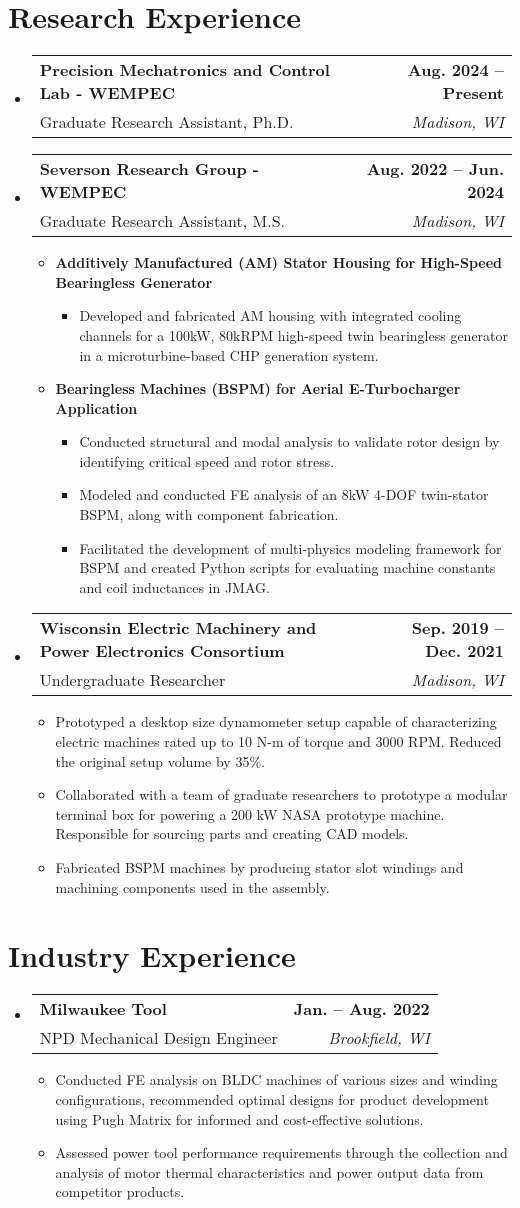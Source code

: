 \documentclass[letterpaper,11pt]{article}
\makeatletter
\newcommand{\resumeItem}[1]{
  \item\small{
    {#1 \vspace{-2pt}}
  }
}
\newcommand{\resumeSubItem}[1]{
  \item[$\circ$]\small{
    {#1 \vspace{-2pt}}
  }
}
\newcommand{\resumeSubheading}[4]{
  \vspace{-2pt}\item
    \begin{tabular*}{1.0\textwidth}[t]{l@{\extracolsep{\fill}}r}
      \textbf{#1} & \textbf{\small #2} \\
      \small#3 & \textit{\small #4} \\
    \end{tabular*}\vspace{-7pt}
}
\newcommand{\resumeSubHeadingListStart}{\begin{itemize}[leftmargin=0.0in, label={}]}
\newcommand{\resumeSubHeadingListEnd}{\end{itemize}}
\newcommand{\resumeItemListStart}{\begin{itemize}[leftmargin=20pt]}
\newcommand{\resumeItemListEnd}{\end{itemize}\vspace{-5pt}}
\newcommand{\resumeSubItemListStart}{\begin{itemize}[leftmargin=10pt]}
\newcommand{\resumeSubItemListEnd}{\end{itemize}\vspace{-2pt}}
\makeatother
\begin{document}
\section{Research Experience}
\resumeSubHeadingListStart
\resumeSubheading
{Precision Mechatronics and Control Lab - WEMPEC}{Aug. 2024 -- Present}
{Graduate Research Assistant, Ph.D.}{Madison, WI}
\resumeSubheading
{Severson Research Group - WEMPEC}{Aug. 2022 -- Jun. 2024}
{Graduate Research Assistant, M.S.}{Madison, WI}
\resumeItemListStart
\resumeItem{\textbf{Additively Manufactured (AM) Stator Housing for High-Speed Bearingless Generator}}
\resumeSubItemListStart
\resumeSubItem{Developed and fabricated AM housing with integrated cooling channels for a 100kW, 80kRPM high-speed twin bearingless generator in a microturbine-based CHP generation system.}
\resumeSubItemListEnd
\resumeItem{\textbf{Bearingless Machines (BSPM) for Aerial E-Turbocharger Application}}
\resumeSubItemListStart
\resumeSubItem{Conducted structural and modal analysis to validate rotor design by identifying critical speed and rotor stress.}
\resumeSubItem{Modeled and conducted FE analysis of an 8kW 4-DOF twin-stator BSPM, along with component fabrication.}
\resumeSubItem{Facilitated the development of multi-physics modeling framework for BSPM and created Python scripts for evaluating machine constants and coil inductances in JMAG.}
\resumeSubItemListEnd
\resumeItemListEnd
\resumeSubheading
{Wisconsin Electric Machinery and Power Electronics Consortium}{Sep. 2019 – Dec. 2021}
{Undergraduate Researcher}{Madison, WI}
\resumeItemListStart
\resumeItem{Prototyped a desktop size dynamometer setup capable of characterizing electric machines rated up to 10 N-m of torque and 3000 RPM. Reduced the original setup volume by 35\%.}
\resumeItem{Collaborated with a team of graduate researchers to prototype a modular terminal box for powering a 200 kW NASA prototype machine. Responsible for sourcing parts and creating CAD models. }
\resumeItem{Fabricated BSPM machines by producing stator slot windings and machining components used in the assembly. }
\resumeItemListEnd
\resumeSubHeadingListEnd
\vspace{-13pt}

\section{Industry Experience}
\resumeSubHeadingListStart

\resumeSubheading
{Milwaukee Tool}{Jan. – Aug. 2022}
{NPD Mechanical Design Engineer}{Brookfield, WI}
\resumeItemListStart
\resumeItem{Conducted FE analysis on BLDC machines of various sizes and winding configurations, recommended optimal designs for product development using Pugh Matrix for informed and cost-effective solutions.}
\resumeItem{Assessed power tool performance requirements through the collection and analysis of motor thermal characteristics and power output data from competitor products.}
\resumeItemListEnd
\vspace{-5pt}
\resumeSubHeadingListEnd
\end{document}
